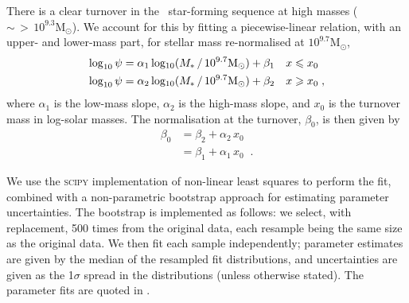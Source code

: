 There is a clear turnover in the \flares\ star-forming sequence at high masses ($\sim \,>\, 10^{9.3} \mathrm{M_{\odot}}$).
We account for this by fitting a piecewise-linear relation, with an upper- and lower-mass part, for stellar mass re-normalised at $10^{9.7} \mathrm{M_{\odot}}$,
\begin{align}
	\log_{10}\psi = \alpha_{1} \, \mathrm{log_{10}}(M_{*}\,/\,10^{9.7} \mathrm{M_{\odot}}) + \beta_{1} \quad & x \leqslant x_{0} \\
	\log_{10}\psi = \alpha_{2} \, \mathrm{log_{10}}(M_{*}\,/\,10^{9.7} \mathrm{M_{\odot}}) + \beta_{2} \quad & x \geqslant x_{0} \;,
\end{align}
where $\alpha_{1}$ is the low-mass slope, $\alpha_{2}$ is the high-mass slope, and $x_{0}$ is the turnover mass in log-solar masses. The normalisation at the turnover, $\beta_{0}$, is then given by
\begin{align}
\beta_{0} & = \beta_{2} + \alpha_{2} \, x_{0} \\
& = \beta_{1} + \alpha_{1} \, x_{0} \;\;.
\end{align}

We use the \textsc{scipy} implementation of non-linear least squares to perform the fit, combined with a non-parametric bootstrap approach for estimating parameter uncertainties.
The bootstrap is implemented as follows: we select, with replacement, 500 times from the original data, each resample being the same size as the original data.
We then fit each sample independently; parameter estimates are given by the median of the resampled fit distributions, and uncertainties are given as the 1$\sigma$ spread in the distributions (unless otherwise stated).
The parameter fits are quoted in \protect{}.

